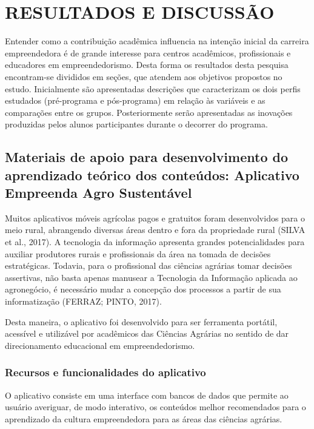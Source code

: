 \chapter{RESULTADOS E DISCUSSÃO}

Entender como a contribuição acadêmica influencia na intenção inicial da carreira empreendedora é de grande interesse para centros acadêmicos, profissionais e educadores em empreendedorismo. Desta forma os resultados desta pesquisa encontram-se divididos em seções, que atendem aos objetivos propostos no estudo.
Inicialmente são apresentadas descrições que caracterizam os dois perfis estudados
(pré-programa e pós-programa) em relação às variáveis e as comparações entre os grupos. Posteriormente serão apresentadas as inovações produzidas pelos alunos participantes durante o decorrer do programa.



\section{Materiais de apoio para desenvolvimento do aprendizado teórico dos conteúdos: Aplicativo Empreenda Agro Sustentável}

Muitos aplicativos móveis agrícolas pagos e gratuitos foram desenvolvidos para o meio rural, abrangendo diversas áreas dentro e fora da propriedade rural (SILVA et al., 2017). A tecnologia da informação apresenta grandes potencialidades para auxiliar produtores rurais e profissionais da área na tomada de decisões estratégicas. Todavia, para o profissional das ciências agrárias tomar decisões assertivas, não basta apenas manusear a Tecnologia da Informação aplicada ao agronegócio, é   necessário   mudar   a   concepção   dos   processos   a   partir   de   sua informatização (FERRAZ; PINTO, 2017).

Desta maneira, o aplicativo foi desenvolvido para ser ferramenta portátil, acessível e utilizável por acadêmicos das Ciências Agrárias no sentido de dar direcionamento educacional em empreendedorismo. 


\subsection{Recursos e funcionalidades do aplicativo}

O aplicativo consiste em uma interface com bancos de dados que permite ao usuário averiguar, de modo interativo, os conteúdos melhor recomendados para o aprendizado da cultura empreendedora para as áreas das ciências agrárias. 

